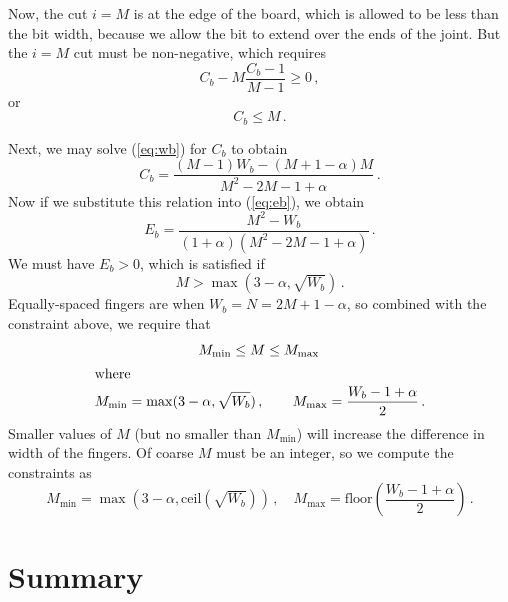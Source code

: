 \documentclass[12pt,final]{article}
\begin{document}
Now, the cut $i=M$ is at the edge of the board, which is allowed to be less
than the bit width, because we allow the bit to extend over the ends of the
joint.  But the $i=M$ cut must be non-negative, which requires
\begin{equation}
  C_b - M \frac{C_b - 1}{M-1} \ge 0\,,
\end{equation}
or
\begin{equation}
  C_b \le M\,.
\end{equation}

Next, we may solve (\ref{eq:wb}) for $C_b$ to obtain
\begin{equation}
  \label{eq:cb}
  C_b = \frac{(M-1)W_b - (M+1-\alpha)M}{M^2 - 2M - 1 + \alpha}\,.
\end{equation}
Now if we substitute this relation into (\ref{eq:eb}), we obtain
\begin{equation}
  E_b = \frac{M^2 - W_b}{(1 + \alpha)(M^2 - 2M - 1 + \alpha)}\,.
\end{equation}
We must have $E_b > 0$, which is satisfied if
\begin{equation}
  M > \max(3 - \alpha, \sqrt{W_b})\,.
\end{equation}
Equally-spaced fingers are when $W_b = N = 2M + 1 - \alpha$, so combined with
the constraint above, we require that
\begin{gather}
  M_{\min} \le M \le M_{\max}\,\\
\intertext{where}
M_{\min} = \max(3 - \alpha, \sqrt{W_b})\,, \qquad
  M_{\max} = \frac{W_b - 1 + \alpha}{2}\,.
\end{gather}
Smaller values of $M$ (but no smaller than $M_{\min}$) will increase 
the difference in width of the fingers.  Of coarse $M$ must be an integer, so
we compute the constraints as
\begin{equation}
\label{eq:mConstraints}
M_{\min} = \max\left(3-\alpha, \text{ceil}\left(\sqrt{W_b}\right)\right)\,, \quad
  M_{\max} = \text{floor}\left(\frac{W_b - 1 + \alpha}{2}\right)\,.
\end{equation}

\section{Summary}
\end{document}
